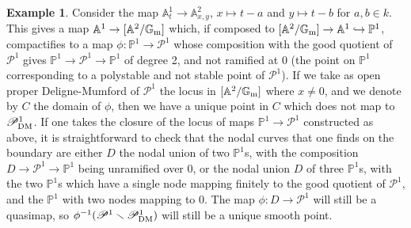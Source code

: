 \documentclass{amsart}
\newcommand{\bA}{\mathbb{A}}
\newcommand{\bG}{\mathbb{G}}
\newcommand{\bP}{\mathbb{P}}
\newcommand{\sP}{\mathscr{P}}
\newcommand{\Gm}{\bG_{{\rm m}}}
\newcommand{\dm}{{\rm DM}}
\theoremstyle{definition}
\theoremstyle{definition}
\newtheorem{example}[theorem]{Example}
\begin{document}
{\begin{example}
Consider the map $\bA^1_t\to \bA^2_{x,y}$, $x\mapsto t-a$ and $y\mapsto t-b$ for $a,b\in k$. This gives a map $\bA^1\to [\bA^2/\Gm]$ which, if composed to $[\bA^2/\Gm]\to \bA^1\hookrightarrow\bP^1$, compactifies to a map $\phi:\bP^1\to\sP^1$ whose composition with the good quotient of $\sP^1$ gives $\bP^1\to \sP^1\to \bP^1$ of degree 2, and not ramified at 0 (the point on $\bP^1$ corresponding to a polystable and not stable point of $\sP^1$).  If we take as open proper Deligne-Mumford of $\sP^1$ the locus in $[\bA^2/\Gm]$ where $x\neq0$, and we denote by $C$ the domain of $\phi$, then we have a unique point in $C$ which does not map to $\sP^1_\dm$. If one takes the closure of the locus of maps $\bP^1\to \sP^1$ constructed as above, it is straightforward to check that the nodal curves that one finds on the boundary are either $D$ the nodal union of two $\bP^1$s, with the composition $D\to \sP^1\to \bP^1$ being unramified over $0$, or the nodal union $D$ of three $\bP^1$s, with the two $\bP^1$s which have a single node mapping finitely to the good quotient of $\sP^1$, and the $\bP^1$ with two nodes mapping to $0$. The map $\phi:D\to \sP^1$ will still be a quasimap, so $\phi^{-1}(\sP^1\smallsetminus\sP^1_\dm)$ will still be a unique smooth point.
\end{example}

}
\end{document}
